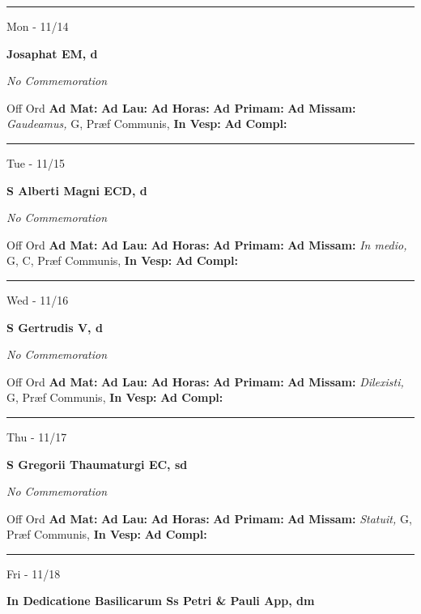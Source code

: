 \documentclass[letterpaper, 10pt]{article}
\begin{document}
\hrule
\begin{center}
Mon - 11/14
\end{center}\textbf{ \large Josaphat EM, \textnormal{\normalsize d}}

\textit{No Commemoration}\begin{justify}
Off Ord
\textbf{Ad Mat: }
\textbf{Ad Lau: }
\textbf{Ad Horas: }
\textbf{Ad Primam: }
\textbf{Ad Missam:} \textit{Gaudeamus, } G, Præf Communis, 
\textbf{In Vesp: }
\textbf{Ad Compl: }\end{justify}



\hrule
\begin{center}
Tue - 11/15
\end{center}\textbf{ \large S Alberti Magni ECD, \textnormal{\normalsize d}}

\textit{No Commemoration}\begin{justify}
Off Ord
\textbf{Ad Mat: }
\textbf{Ad Lau: }
\textbf{Ad Horas: }
\textbf{Ad Primam: }
\textbf{Ad Missam:} \textit{In medio, } G, C, Præf Communis, 
\textbf{In Vesp: }
\textbf{Ad Compl: }\end{justify}



\hrule
\begin{center}
Wed - 11/16
\end{center}\textbf{ \large S Gertrudis V, \textnormal{\normalsize d}}

\textit{No Commemoration}\begin{justify}
Off Ord
\textbf{Ad Mat: }
\textbf{Ad Lau: }
\textbf{Ad Horas: }
\textbf{Ad Primam: }
\textbf{Ad Missam:} \textit{Dilexisti, } G, Præf Communis, 
\textbf{In Vesp: }
\textbf{Ad Compl: }\end{justify}



\hrule
\begin{center}
Thu - 11/17
\end{center}\textbf{ \large S Gregorii Thaumaturgi EC, \textnormal{\normalsize sd}}

\textit{No Commemoration}\begin{justify}
Off Ord
\textbf{Ad Mat: }
\textbf{Ad Lau: }
\textbf{Ad Horas: }
\textbf{Ad Primam: }
\textbf{Ad Missam:} \textit{Statuit, } G, Præf Communis, 
\textbf{In Vesp: }
\textbf{Ad Compl: }\end{justify}



\hrule
\begin{center}
Fri - 11/18
\end{center}\textbf{ \large In Dedicatione Basilicarum Ss Petri \& Pauli App, \textnormal{\normalsize dm}}
\end{document}
